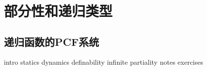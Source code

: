 \part{部分性和递归类型}

\chapter{递归函数的PCF系统}

{intro}
{statics}
{dynamics}
{definability}
{infinite}
{partiality}
{notes}
{exercises}